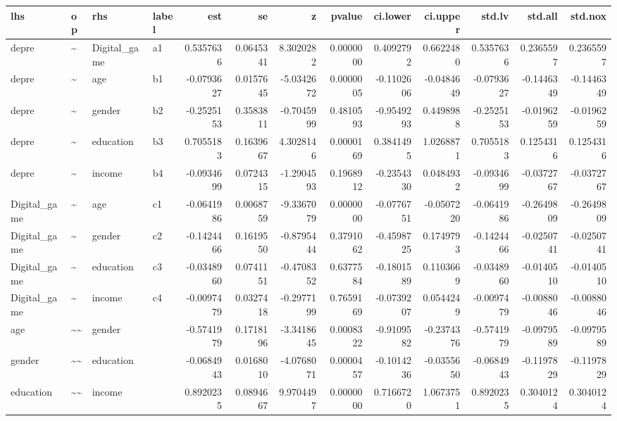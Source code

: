 \documentclass[
]{article}
\begin{document}
\begin{table}[!h]
\centering
\begin{tabular}[t]{llllrrrrrrrrr}
\toprule
lhs & op & rhs & label & est & se & z & pvalue & ci.lower & ci.upper & std.lv & std.all & std.nox\\
\midrule
depre & \textasciitilde{} & Digital\_game & a1 & 0.5357636 & 0.0645341 & 8.3020282 & 0.0000000 & 0.4092792 & 0.6622480 & 0.5357636 & 0.2365597 & 0.2365597\\
depre & \textasciitilde{} & age & b1 & -0.0793627 & 0.0157645 & -5.0342672 & 0.0000005 & -0.1102606 & -0.0484649 & -0.0793627 & -0.1446349 & -0.1446349\\
depre & \textasciitilde{} & gender & b2 & -0.2525153 & 0.3583811 & -0.7045999 & 0.4810593 & -0.9549293 & 0.4498988 & -0.2525153 & -0.0196259 & -0.0196259\\
depre & \textasciitilde{} & education & b3 & 0.7055183 & 0.1639667 & 4.3028146 & 0.0000169 & 0.3841495 & 1.0268871 & 0.7055183 & 0.1254316 & 0.1254316\\
depre & \textasciitilde{} & income & b4 & -0.0934699 & 0.0724315 & -1.2904593 & 0.1968912 & -0.2354330 & 0.0484932 & -0.0934699 & -0.0372767 & -0.0372767\\
\addlinespace
Digital\_game & \textasciitilde{} & age & c1 & -0.0641986 & 0.0068759 & -9.3367079 & 0.0000000 & -0.0776751 & -0.0507220 & -0.0641986 & -0.2649809 & -0.2649809\\
Digital\_game & \textasciitilde{} & gender & c2 & -0.1424466 & 0.1619550 & -0.8795444 & 0.3791062 & -0.4598725 & 0.1749793 & -0.1424466 & -0.0250741 & -0.0250741\\
Digital\_game & \textasciitilde{} & education & c3 & -0.0348960 & 0.0741151 & -0.4708352 & 0.6377584 & -0.1801589 & 0.1103669 & -0.0348960 & -0.0140510 & -0.0140510\\
Digital\_game & \textasciitilde{} & income & c4 & -0.0097479 & 0.0327418 & -0.2977199 & 0.7659169 & -0.0739207 & 0.0544249 & -0.0097479 & -0.0088046 & -0.0088046\\
age & \textasciitilde{}\textasciitilde{} & gender &  & -0.5741979 & 0.1718196 & -3.3418645 & 0.0008322 & -0.9109582 & -0.2374376 & -0.5741979 & -0.0979589 & -0.0979589\\
\addlinespace
gender & \textasciitilde{}\textasciitilde{} & education &  & -0.0684943 & 0.0168010 & -4.0768071 & 0.0000457 & -0.1014236 & -0.0355650 & -0.0684943 & -0.1197829 & -0.1197829\\
education & \textasciitilde{}\textasciitilde{} & income &  & 0.8920235 & 0.0894667 & 9.9704497 & 0.0000000 & 0.7166720 & 1.0673751 & 0.8920235 & 0.3040124 & 0.3040124\\

\end{tabular}
\end{table}
\end{document}
